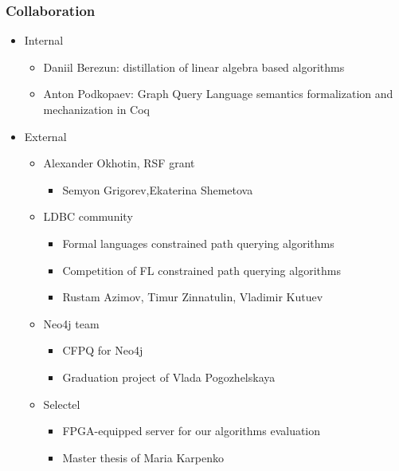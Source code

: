 \documentclass[xcolor=table, aspectratio=169]{beamer}
\begin{document}
\begin{frame}[fragile]

  \frametitle{Collaboration}
\begin{itemize}
      \item Internal
      \begin{itemize}
        \item Daniil Berezun: distillation of linear algebra based algorithms
        \item Anton Podkopaev: Graph Query Language semantics formalization and mechanization in Coq
      \end{itemize}
      \item External
      \begin{itemize}
      \item Alexander Okhotin, RSF grant 
      \begin{itemize}
        \item Semyon Grigorev,Ekaterina Shemetova
      \end{itemize}
      \item LDBC community
      \begin{itemize}
        \item Formal languages constrained path querying algorithms
        \item Competition of FL constrained path querying algorithms 
        \item Rustam Azimov, Timur Zinnatulin, Vladimir Kutuev
      \end{itemize}
      \item Neo4j team
      \begin{itemize}
        \item CFPQ for Neo4j
        \item Graduation project of Vlada Pogozhelskaya
      \end{itemize}
      \item Selectel
      \begin{itemize}
        \item FPGA-equipped server for our algorithms evaluation
        \item Master thesis of Maria Karpenko 
      \end{itemize}
    \end{itemize}
\end{itemize}
\end{frame}
\end{document}
